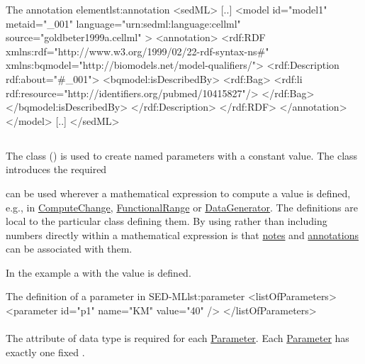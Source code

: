 \begin{myXmlLst}{The annotation element}{lst:annotation}
<sedML>
	[..]
	<model id="model1" metaid="_001" language="urn:sedml:language:cellml" source="goldbeter1999a.cellml" >
		<annotation>
    		<rdf:RDF xmlns:rdf="http://www.w3.org/1999/02/22-rdf-syntax-ns#" xmlns:bqmodel="http://biomodels.net/model-qualifiers/">
				<rdf:Description rdf:about="#_001">
				<bqmodel:isDescribedBy>
				<rdf:Bag>
					<rdf:li rdf:resource="http://identifiers.org/pubmed/10415827"/>
				</rdf:Bag>
				</bqmodel:isDescribedBy>
    			</rdf:Description>
			</rdf:RDF>
		</annotation>
	</model>
	[..]
</sedML>
\end{myXmlLst}


\subsection{}
\label{class:parameter}
The  class () is used to create named parameters with a constant value.
The  class introduces the required 


 can be used wherever a mathematical expression to compute a value is defined, e.g., in \hyperref[class:computeChange]{ComputeChange}, \hyperref[class:functionalRange]{FunctionalRange} or \hyperref[class:dataGenerator]{DataGenerator}. The  definitions are local to the particular class defining them. By using  rather than including numbers directly within a mathematical expression is that \hyperref[class:notes]{notes} and \hyperref[class:annotation]{annotations} can be associated with them.

In the example a   with the value  is defined. 
\begin{myXmlLst}{The definition of a parameter in SED-ML}{lst:parameter}
<listOfParameters>
	<parameter id="p1" name="KM" value="40" />
</listOfParameters>
\end{myXmlLst}


\paragraph*{}
\label{sec:value}
The  attribute of data type  is required for each \hyperref[class:parameter]{Parameter}. Each \hyperref[class:parameter]{Parameter} has exactly one fixed .


